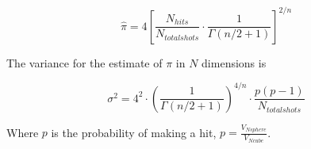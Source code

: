 \documentclass[11pt]{amsart}
\begin{document}
\begin{equation}
\hat \pi = 4 \left[ \frac{N_{hits}}{N_{totalshots}} \cdot \frac{1}{\Gamma(n/2+1)} \right] ^{2/n}
\end{equation}
\vspace{5 mm}

The variance for the estimate of $\pi$ in $N$ dimensions is 

\begin{equation}
\sigma ^2 = 4^2 \cdot \left( \frac{1}{\Gamma(n/2+1)} \right) ^{4/n} \cdot \frac{p (p-1)}{N_{totalshots}}
\end{equation}
\vspace{5 mm}

Where $p$ is the probability of making a hit, $p= \frac{V_{Nsphere}}{V_{Ncube}}$.
\end{document}
